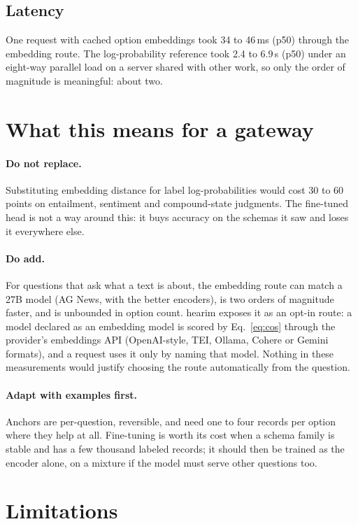 \documentclass[11pt]{article}
\begin{document}
\subsection{Latency}

One request with cached option embeddings took 34 to 46\,ms (p50) through the
embedding route. The log-probability reference took 2.4 to 6.9\,s (p50) under
an eight-way parallel load on a server shared with other work, so only the
order of magnitude is meaningful: about two.

\section{What this means for a gateway}

\paragraph{Do not replace.} Substituting embedding distance for label
log-probabilities would cost 30 to 60 points on entailment, sentiment and
compound-state judgments. The fine-tuned head is not a way around this: it
buys accuracy on the schemas it saw and loses it everywhere else.

\paragraph{Do add.} For questions that ask what a text is about, the
embedding route can match a 27B model (AG News, with the better encoders),
is two orders of magnitude faster, and is unbounded in option count. hearim exposes it as an opt-in route: a
model declared as an embedding model is scored by Eq.~\eqref{eq:cos} through
the provider's embeddings API (OpenAI-style, TEI, Ollama, Cohere or Gemini
formats), and a request uses it only by naming that model. Nothing in these
measurements would justify choosing the route automatically from the question.

\paragraph{Adapt with examples first.} Anchors are per-question, reversible,
and need one to four records per option where they help at all. Fine-tuning is
worth its cost when a schema family is stable and has a few thousand labeled
records; it should then be trained as the encoder alone, on a mixture if the
model must serve other questions too.

\section{Limitations}
\end{document}

